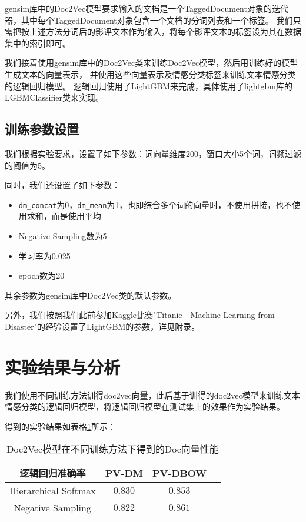 \documentclass{article}
\begin{document}
gensim库中的Doc2Vec模型要求输入的文档是一个TaggedDocument对象的迭代器，其中每个TaggedDocument对象包含一个文档的分词列表和一个标签。
我们只需把按上述方法分词后的影评文本作为输入，将每个影评文本的标签设为其在数据集中的索引即可。

我们接着使用gensim库中的Doc2Vec类来训练Doc2Vec模型，然后用训练好的模型生成文本的向量表示，
并使用这些向量表示及情感分类标签来训练文本情感分类的逻辑回归模型。
逻辑回归使用了LightGBM来完成，具体使用了lightgbm库的LGBMClassifier类来实现。

\subsection{训练参数设置}
我们根据实验要求，设置了如下参数：词向量维度200，窗口大小5个词，词频过滤的阈值为5。

同时，我们还设置了如下参数：
\begin{itemize}
  \item \verb|dm_concat|为0，\verb|dm_mean|为1，也即综合多个词的向量时，不使用拼接，也不使用求和，而是使用平均
  \item Negative Sampling数为5
  \item 学习率为0.025
  \item epoch数为20
\end{itemize}

其余参数为gensim库中Doc2Vec类的默认参数。

另外，我们按照我们此前参加Kaggle比赛"Titanic - Machine Learning from Disaster"的经验设置了LightGBM的参数，详见附录。



\section{实验结果与分析}

我们使用不同训练方法训得doc2vec向量，此后基于训得的doc2vec模型来训练文本情感分类的逻辑回归模型，将逻辑回归模型在测试集上的效果作为实验结果。

得到的实验结果如表格\ref{tab:results}所示：
\begin{table}[htbp]
  \caption{Doc2Vec模型在不同训练方法下得到的Doc向量性能}
  \label{tab:results}
  \vspace{5pt}
  \centering
  \begin{tabular}{cccc}
    \toprule
    逻辑回归准确率       & PV-DM   & PV-DBOW \\
    \midrule
    Hierarchical Softmax & $0.830$ & $0.853$ \\
    \midrule
    Negative Sampling    & $0.822$ & $0.861$ \\
    \bottomrule
  \end{tabular}
\end{table}
\end{document}
